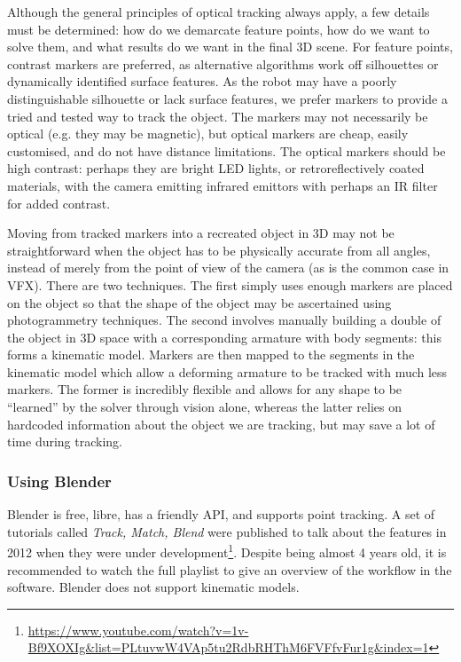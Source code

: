 Although the general principles of optical tracking always apply, a few details must be determined: how do we demarcate feature points, how do we want to solve them, and what results do we want in the final 3D scene. For feature points, contrast markers are preferred, as alternative algorithms work off silhouettes or dynamically identified surface features. As the robot may have a poorly distinguishable silhouette or lack surface features, we prefer markers to provide a tried and tested way to track the object. The markers may not necessarily be optical (e.g. they may be magnetic), but optical markers are cheap, easily customised, and do not have distance limitations. The optical markers should be high contrast: perhaps they are bright LED lights, or retroreflectively coated materials, with the camera emitting infrared emittors with perhaps an IR filter for added contrast.

Moving from tracked markers into a recreated object in 3D may not be straightforward when the object has to be physically accurate from all angles, instead of merely from the point of view of the camera (as is the common case in VFX). There are two techniques. The first simply uses enough markers are placed on the object so that the shape of the object may be ascertained using photogrammetry techniques. The second involves manually building a double of the object in 3D space with a corresponding armature with body segments: this forms a kinematic model. Markers are then mapped to the segments in the kinematic model which allow a deforming armature to be tracked with much less markers. The former is incredibly flexible and allows for any shape to be ``learned'' by the solver through vision alone, whereas the latter relies on hardcoded information about the object we are tracking, but may save a lot of time during tracking.

\subsubsection{Using Blender}

Blender is free, libre, has a friendly API, and supports point tracking. A set of tutorials called \emph{Track, Match, Blend} were published to talk about the features in 2012 when they were under development\footnote{\url{https://www.youtube.com/watch?v=1v-Bf9XOXIg&list=PLtuvwW4VAp5tu2RdbRHThM6FVFfvFur1g&index=1}}. Despite being almost 4 years old, it is recommended to watch the full playlist to give an overview of the workflow in the software. Blender does not support kinematic models.

